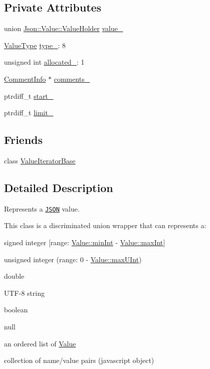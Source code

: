 \subsection*{Private Attributes}
\begin{DoxyCompactItemize}
\item 
union \hyperlink{union_json_1_1_value_1_1_value_holder}{Json\+::\+Value\+::\+Value\+Holder} \hyperlink{class_json_1_1_value_aef578244546212705b9f81eb84d7e151}{value\+\_\+}
\item 
\hyperlink{namespace_json_a7d654b75c16a57007925868e38212b4e}{Value\+Type} \hyperlink{class_json_1_1_value_abd222c2536dc88bf330dedcd076d2356}{type\+\_\+}\+: 8
\item 
unsigned int \hyperlink{class_json_1_1_value_ae0126c80dc4907aad94088553fc7632b}{allocated\+\_\+}\+: 1
\item 
\hyperlink{struct_json_1_1_value_1_1_comment_info}{Comment\+Info} $\ast$ \hyperlink{class_json_1_1_value_a2016564cabc7a29208e97bd0b782a4e4}{comments\+\_\+}
\item 
ptrdiff\+\_\+t \hyperlink{class_json_1_1_value_a1c3aeb0fa8fefe93776cb347c76a25a8}{start\+\_\+}
\item 
ptrdiff\+\_\+t \hyperlink{class_json_1_1_value_afe377e25f6d3b5b8ea7221c84f29412a}{limit\+\_\+}
\end{DoxyCompactItemize}
\subsection*{Friends}
\begin{DoxyCompactItemize}
\item 
class \hyperlink{class_json_1_1_value_ad016df56489e5d360735457afba2f649}{Value\+Iterator\+Base}
\end{DoxyCompactItemize}


\subsection{Detailed Description}
Represents a \href{http://www.json.org}{\tt J\+S\+ON} value. 

This class is a discriminated union wrapper that can represents a\+:
\begin{DoxyItemize}
\item signed integer \mbox{[}range\+: \hyperlink{class_json_1_1_value_a7df8a39e2502b8c92a6a41e3d752d2c8}{Value\+::min\+Int} -\/ \hyperlink{class_json_1_1_value_a978c799a8af3114ef7dab6fd0a310a1b}{Value\+::max\+Int}\mbox{]}
\item unsigned integer (range\+: 0 -\/ \hyperlink{class_json_1_1_value_ac79e63ee68d3aa914bfd6988be669b87}{Value\+::max\+U\+Int})
\item double
\item U\+T\+F-\/8 string
\item boolean
\item \textquotesingle{}null\textquotesingle{}
\item an ordered list of \hyperlink{class_json_1_1_value}{Value}
\item collection of name/value pairs (javascript object)
\end{DoxyItemize}

